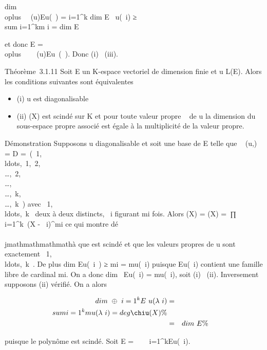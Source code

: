 dim~ \\oplus~
\lambda~\in{}(u)Eu(\lambda~) =
\sum i=1^k dim E~
u(\lambda~i) ≥\\sum
i=1^km i = dim E

et donc E = \\oplus~ ~
\lambda~\in{}(u)Eu~(\lambda~).
Donc (i) \rigtharrow~(iii).

Théorème~3.1.11 Soit E un K-espace vectoriel de dimension finie et u \in
L(E). Alors les conditions suivantes sont équivalentes

\begin{itemize}
\itemsep1pt\parskip0pt
\item
  (i) u est diagonalisable
\item
  (ii) \chiu(X) est scindé sur K et pour toute valeur propre \lambda~ de
  u la dimension du sous-espace propre associé est égale à la
  multiplicité de la valeur propre.
\end{itemize}

Démonstration Supposons u diagonalisable et soit  une base de E telle
que \mathrmMat~ (u,) = D
=\
\mathrmdiag(\lambda~1,\\ldots,\lambda~1,\lambda~2,\\\ldots,\lambda~2,\\\ldots,\\\ldots,\lambda~k,\\\ldots,\lambda~k~)
avec
\lambda~1,\\ldots,\lambda~k~
deux à deux distincts, \lambda~i figurant mi fois. Alors
\chiu(X) = \chiD(X) =\
∏  i=1^k~(X -
\lambda~i)^mi ce qui montre dé\\\\jmathmathmathmathà que \chiu
est scindé et que les valeurs propres de u sont exactement
\lambda~1,\\ldots,\lambda~k~.
De plus dim Eu(\lambda~i~) ≥
mi = mu(\lambda~i) puisque
Eu(\lambda~i) contient une famille libre de cardinal
mi. On a donc dim~
Eu(\lambda~i) = mu(\lambda~i), soit (i) \rigtharrow~(ii).
Inversement supposons (ii) vérifié. On a alors

\begin{align*} dim~
\oplus~ i=1^kE~
u(\lambda~i)& =& \\sum
i=1^km u(\lambda~i) = deg
\chiu(X)\%& \\ & =&
dim~ E \%& \\
\end{align*}

puisque le polynôme est scindé. Soit E =\
\oplus~ ~
i=1^kEu(\lambda~i).


